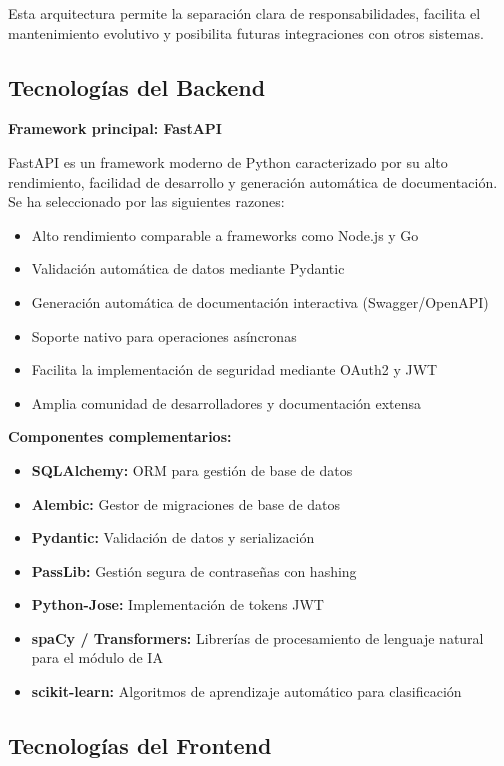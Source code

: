 \documentclass[12pt,letterpaper]{article}
\begin{document}
Esta arquitectura permite la separación clara de responsabilidades, facilita el mantenimiento evolutivo y posibilita futuras integraciones con otros sistemas.

\subsection{Tecnologías del Backend}

\textbf{Framework principal: FastAPI}

FastAPI es un framework moderno de Python caracterizado por su alto rendimiento, facilidad de desarrollo y generación automática de documentación. Se ha seleccionado por las siguientes razones:

\begin{itemize}
    \item Alto rendimiento comparable a frameworks como Node.js y Go
    \item Validación automática de datos mediante Pydantic
    \item Generación automática de documentación interactiva (Swagger/OpenAPI)
    \item Soporte nativo para operaciones asíncronas
    \item Facilita la implementación de seguridad mediante OAuth2 y JWT
    \item Amplia comunidad de desarrolladores y documentación extensa
\end{itemize}

\textbf{Componentes complementarios:}

\begin{itemize}
    \item \textbf{SQLAlchemy:} ORM para gestión de base de datos
    \item \textbf{Alembic:} Gestor de migraciones de base de datos
    \item \textbf{Pydantic:} Validación de datos y serialización
    \item \textbf{PassLib:} Gestión segura de contraseñas con hashing
    \item \textbf{Python-Jose:} Implementación de tokens JWT
    \item \textbf{spaCy / Transformers:} Librerías de procesamiento de lenguaje natural para el módulo de IA
    \item \textbf{scikit-learn:} Algoritmos de aprendizaje automático para clasificación
\end{itemize}

\subsection{Tecnologías del Frontend}
\end{document}
